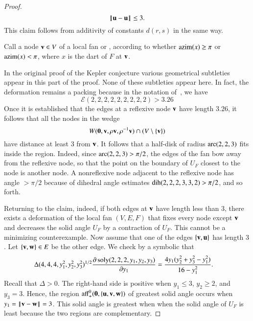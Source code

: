 \documentclass{llncs}
\def\op#1{{\hbox{#1}}}
\begin{document}
\begin{proof}
\[
\norm{\u}{\u}\le 3.
\]
This claim follows from additivity of constants $d(r,s)$ in the same way.


Call a node ${\mathbf v}\in V$ of a local fan  
or , according
to whether $\op{azim}(x)\ge\pi$ or $\op{azim}(x)<\pi$, where $x$ is
the dart of $F$ at ${\mathbf v}$. 





In the original proof of the Kepler conjecture 
  various geometrical subtleties appear in this part of the
  proof.  None of these subtleties appear here.  In fact, the
  deformation remains a packing because in the notation of~\cite{Hales:2006:DCG},
 we have
\[
{\mathcal E}(2,2,2,2,2,2,2,2,2)> 3.26
\]
Once it is established that the edges at a reflexive node ${\mathbf v}$ have length $3.26$, it
follows that all the nodes in the wedge
\[
W({\mathbf 0},{\mathbf v},\rho{\mathbf v},\rho^{-1}{\mathbf v})\cap (V\setminus\{{\mathbf v}\})
\]
have distance at least $3$ from ${\mathbf v}$.  It follows that a half-disk
of radius $\operatorname{arc}(2,2,3)$ fits inside the region.  Indeed, since
$\operatorname{arc}(2,2,3)>\pi/2$, the edges of the fan bow away from the reflexive node, so
that the point on the boundary of $U_F$ closest to the node is another
node.  
A nonreflexive node adjacent to the reflexive node has angle $>\pi/2$
because of dihedral angle estimates $\operatorname{dih}(2,2,2,3,3,2)>\pi/2$, and
so forth.  

Returning to the claim, indeed, 
if both edges at ${\mathbf v}$ have length less than $3$, there
exists a deformation of the local fan $(V,E,F)$ that fixes every node
except ${\mathbf v}$ and decreases the solid angle $U_F$ by a contraction of $U_F$.  
This cannot be a
minimizing counterexample.  Now assume that one of the edges
$\{{\mathbf v},{\mathbf u}\}$ has length $3$.  Let $\{{\mathbf v},{\mathbf w}\}\in E$ be the other edge.
We check by a symbolic
 that
\begin{align}\label{eqn:dsol}
\Delta(4,4,4,y_1^2,y_2^2,y_3^2)^{1/2}\dfrac{\partial\,\op{soly}(2,2,2,y_1,y_2,y_3)}{\partial y_1} &= 
\dfrac{4 y_1 (y_2^2 + y_3^2- y_1^2)}{16- y_1^2}.
\end{align}
 Recall that $\Delta>0$.
The right-hand side is positive
when $y_1\le3$, $y_2\ge 2$, and $y_3=3$. 
Hence, the region
$\op{aff}^0_+(\orz,\{\u,\v,\w\})$ of greatest
solid angle occurs when $y_1=\norm{\v}{\w}=3$.  This solid angle is greatest when
when the solid angle of $U_F$ is least because  the two regions are complementary.



\end{proof}
\end{document}
